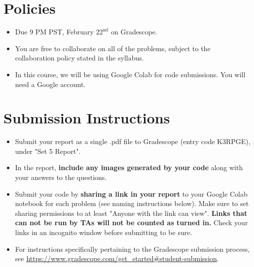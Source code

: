\newif\ifshowsolutions
\showsolutionstrue







\pagestyle{fancy}





\section*{Policies}
\begin{itemize}
	\item Due 9 PM PST, February $22^\text{nd}$ on Gradescope. 
	\item You are free to collaborate on all of the problems, subject to the collaboration policy stated in the syllabus.
	\item In this course, we will be using Google Colab for code submissions. You will need a Google account.
\end{itemize}

\section*{Submission Instructions}

\begin{itemize}
	\item Submit your report as a single .pdf file to Gradescope (entry code K3RPGE), under "Set 5 Report". 
	\item In the report, \textbf{include any images generated by your code} along with your answers to the questions.
	\item Submit your code by \textbf{sharing a link in your report} to your Google Colab notebook for each problem (see naming instructions below). Make sure to set sharing permissions to at least "Anyone with the link can view". \textbf{Links that can not be run by TAs will not be counted as turned in.} Check your links in an incognito window before submitting to be sure. 
	\item For instructions specifically pertaining to the Gradescope submission process, see \url{https://www.gradescope.com/get_started#student-submission}.
	
\end{itemize}



